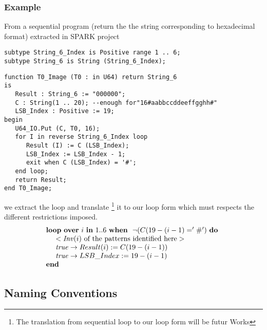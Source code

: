 \documentclass[a4paper,10pt]{article}
\newcommand{\idx}{\ensuremath{i}\xspace}
\newcommand{\KWloop}{\ensuremath{\mathrm{\textbf{loop}}~}}
\newcommand{\KWwhen}{\ensuremath{\mathrm{\textbf{when}}~}}
\newcommand{\KWdo}{\ensuremath{\mathrm{\textbf{do}}~}}
\newcommand{\KWend}{\ensuremath{\mathrm{\textbf{end}}~}}
\newcommand{\KWover}{\ensuremath{\mathrm{\textbf{over}}~}}
\newcommand{\KWin}{\ensuremath{~\mathrm{\textbf{in}}~}}
\newcommand{\Inv}[1]{\ensuremath{\mathit{Inv}(#1)\xspace}}
\begin{document}
\subsubsection*{Example}
From a sequential program (return the the string corresponding to hexadecimal format) 
extracted in SPARK project ~\cite{sparkskein:url} 
\begin{lstlisting}
subtype String_6_Index is Positive range 1 .. 6;
subtype String_6 is String (String_6_Index);
\end{lstlisting}

\begin{lstlisting}
function T0_Image (T0 : in U64) return String_6
is
   Result : String_6 := "000000";
   C : String(1 .. 20); --enough for"16#aabbccddeeffgghh#"
   LSB_Index : Positive := 19;
begin
   U64_IO.Put (C, T0, 16);
   for I in reverse String_6_Index loop
      Result (I) := C (LSB_Index);
      LSB_Index := LSB_Index - 1;
      exit when C (LSB_Index) = '#';
   end loop;
   return Result;
end T0_Image;
\end{lstlisting}

we extract the loop and translate \footnote{The translation from sequential loop to our 
loop form will be futur Works} it to our loop form which must respects the different 
restrictions imposed.
$$\begin{array}{l}
  \KWloop \KWover \idx \KWin 1 .. 6 ~ \KWwhen ~ \neg (C (19-(\idx-1) = '\#') ~ \KWdo \\
  ~~~~ < \textrm{\Inv{\idx} of the patterns identified here} >\\
  ~~~~ \mathit{true} \rightarrow Result (\idx) := C (19-(\idx-1))\\
  ~~~~ \mathit{true} \rightarrow LSB\_Index := 19 - (\idx-1)\\
  \KWend
\end{array}$$

\subsection{Naming Conventions}
\label{sec:naming-conventions}
\end{document}
